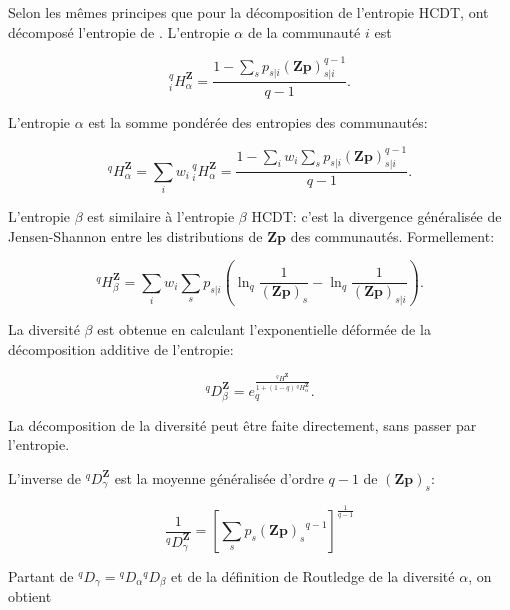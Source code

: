 \documentclass[
  11pt,
  french,
  a4paper,
  extrafontsizes,onecolumn,openright
  ]{memoir}
\begin{document}
Selon les mêmes principes que pour la décomposition de l'entropie HCDT, \textcite{Marcon2014e} ont décomposé l'entropie de \textcite{Ricotta2006b}.
L'entropie \(\alpha\) de la communauté \(i\) est

\begin{equation}
  \label{eq:Hqzialpha}
  ^q_i\!H^{\mathbf{Z}}_\alpha
  = \frac{1-\sum_s{p_{s|i}{\left(\mathbf{Zp}\right)}^{q-1}_{s|i}}}{q-1}.
\end{equation}

L'entropie \(\alpha\) est la somme pondérée des entropies des communautés:

\begin{equation}
  \label{eq:Hqzalpha}
  ^q\!H^{\mathbf{Z}}_\alpha
  = \sum_i{w_i \, ^q_i\!H^{\mathbf{Z}}_\alpha}
  = \frac{1-\sum_i{w_i\sum_s{p_{s|i}{\left(\mathbf{Zp}\right)}^{q-1}_{s|i}}}}{q-1}.
\end{equation}

L'entropie \(\beta\) est similaire à l'entropie \(\beta\) HCDT: c'est la divergence généralisée de Jensen-Shannon entre les distributions de \(\mathbf{Zp}\) des communautés.
Formellement:

\begin{equation}
  \label{eq:Hqzbeta}
  ^q\!H^{\mathbf{Z}}_\beta
  =\sum_i{w_i}\sum_{s}{p_{s|i}\left(\ln_q\frac{1}{{\left(\mathbf{Zp}\right)}_s}-\ln_q\frac{1}{{\left(\mathbf{Zp}\right)}_{s|i}}\right)}.
\end{equation}

La diversité \(\beta\) est obtenue en calculant l'exponentielle déformée de la décomposition additive de l'entropie:

\begin{equation}
  \label{eq:Dqzbeta}
  ^q\!D^{\mathbf{Z}}_\beta
  =e^{\frac{^qH^{\mathbf{Z}}}{1+\left(1-q\right)\,{^qH^{\mathbf{Z}}_\alpha}}}_q.
\end{equation}

La décomposition de la diversité peut être faite directement, sans passer par l'entropie.

L'inverse de \(^q\!D^{\mathbf{Z}}_\gamma\) est la moyenne généralisée d'ordre \(q-1\) de \({\left(\mathbf{Zp}\right)}_s\):

\begin{equation}
  \label{eq:Dqzgamma}
  \frac{1}{^q\!D^{\mathbf{Z}}_\gamma}
  ={\left[\sum_s{p_s{{\left(\mathbf{Zp}\right)}_s}^{q-1}}\right]}^{\frac{1}{q-1}}
\end{equation}

Partant de \(^{q}\!D_{\gamma} = {^{q}\!D_{\alpha}} {^{q}\!D_{\beta}}\) et de la définition de Routledge de la diversité \(\alpha\), on obtient
\end{document}
